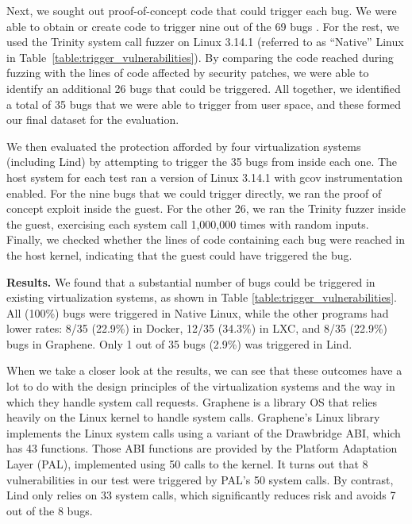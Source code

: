 {{{Next, we sought out proof-of-concept code that could trigger each bug.
We were able to obtain or create code to trigger nine out of the 69 bugs \cite{Exploit-Database}.
For the rest, we used the Trinity system call fuzzer
\cite{Trinity} on Linux 3.14.1 (referred to as ``Native'' Linux in Table~\ref{table:trigger_vulnerabilities}).
By comparing the code reached during fuzzing with the lines of code affected by security patches,
we were able to identify an additional 26 bugs that could be triggered.
All together, we identified a total of 35 bugs that we were able to trigger from user space, and these formed our final dataset for the evaluation.

We then evaluated the protection afforded by four virtualization systems (including Lind) by attempting to trigger the 35 bugs from inside each one.
The host system for each test ran a version of Linux 3.14.1 with gcov instrumentation enabled.
For the nine bugs that we could trigger directly, we ran the proof of concept exploit inside the guest.
For the other 26, we ran the Trinity fuzzer inside the guest, exercising each system call 1,000,000 times with random inputs.
Finally, we checked whether the lines of code containing each bug were reached in the host kernel,
indicating that the guest could have triggered the bug.

\noindent
\textbf{Results.}
We found that a substantial number of bugs could be triggered in existing
virtualization systems, as shown in Table \ref{table:trigger_vulnerabilities}.
All (100\%) bugs were triggered in Native Linux,
while the other programs had lower rates: 8/35 (22.9\%)  in Docker,
12/35 (34.3\%)  in LXC, and 8/35 (22.9\%) bugs in Graphene.
Only 1 out of 35 bugs (2.9\%) was triggered in Lind.

When we take a closer look at the results, we can see that these outcomes
have a lot to do with the design principles of the virtualization systems and
the way in which they handle system call requests.
Graphene \cite{Graphene-14} is a library OS that relies heavily on the Linux kernel to handle system calls.
Graphene's Linux library implements the Linux system calls using a variant of the
Drawbridge \cite{Drawbridge-11} ABI, which has 43 functions. Those ABI functions
are provided by the Platform Adaptation Layer (PAL), implemented using 50 calls
to the kernel. It turns out that 8 vulnerabilities in our test were triggered by PAL's
50 system calls. By contrast, Lind only relies on 33 system calls, which
significantly reduces risk and avoids 7 out of the 8 bugs.

}}}
